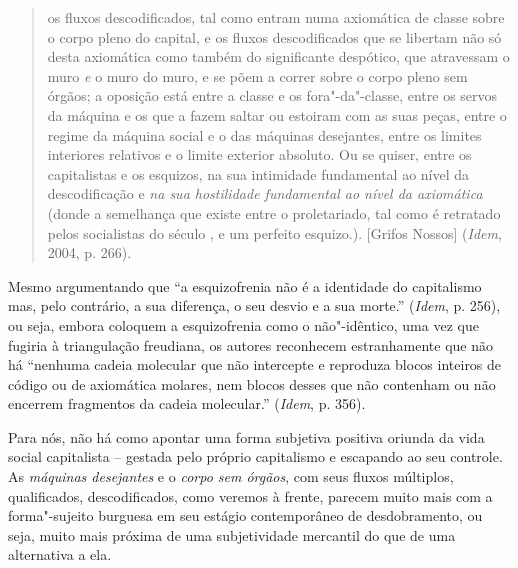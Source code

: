 \begin{quote}
os fluxos descodificados, tal como entram numa axiomática de classe
sobre o corpo pleno do capital, e os fluxos descodificados que se
libertam não só desta axiomática como também do significante despótico,
que atravessam o muro \emph{e} o muro do muro, e se põem a correr sobre
o corpo pleno sem órgãos; a oposição está entre a classe e os
fora"-da"-classe, entre os servos da máquina e os que a fazem saltar ou
estoiram com as suas peças, entre o regime da máquina social e o das
máquinas desejantes, entre os limites interiores relativos e o limite
exterior absoluto. Ou se quiser, entre os capitalistas e os esquizos, na
sua intimidade fundamental ao nível da descodificação e \emph{na sua
hostilidade fundamental ao nível da axiomática} (donde a semelhança que
existe entre o proletariado, tal como é retratado pelos socialistas do
século , e um perfeito esquizo.). [Grifos Nossos] (\emph{Idem},
2004, p. 266).
\end{quote}

Mesmo argumentando que ``a esquizofrenia não é a identidade do
capitalismo mas, pelo contrário, a sua diferença, o seu desvio e a sua
morte.'' (\emph{Idem}, p. 256), ou seja, embora coloquem a esquizofrenia
como o não"-idêntico, uma vez que fugiria à triangulação freudiana, os
autores reconhecem estranhamente que não há ``nenhuma cadeia molecular
que não intercepte e reproduza blocos inteiros de código ou de
axiomática molares, nem blocos desses que não contenham ou não encerrem
fragmentos da cadeia molecular.'' (\emph{Idem}, p. 356).

Para nós, não há como apontar uma forma subjetiva positiva oriunda da
vida social capitalista -- gestada pelo próprio capitalismo e escapando
ao seu controle. As \emph{máquinas desejantes} e o \emph{corpo sem
órgãos}, com seus fluxos múltiplos, qualificados, descodificados, como
veremos à frente, parecem muito mais com a forma"-sujeito burguesa em seu
estágio contemporâneo de desdobramento, ou seja, muito mais próxima de
uma subjetividade mercantil do que de uma alternativa a ela.

